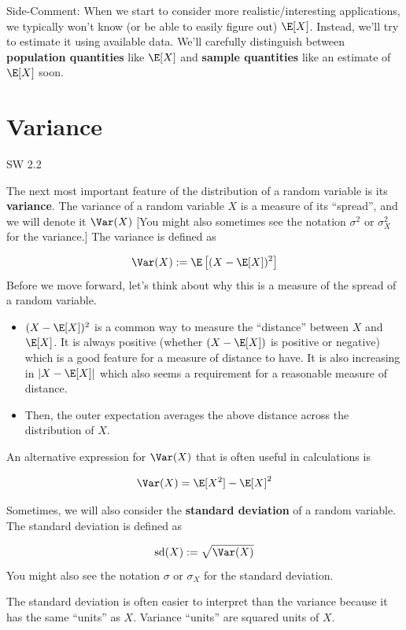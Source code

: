 \documentclass[
  letterpaper,
  DIV=11,
  numbers=noendperiod]{scrreprt}
\begin{document}
{Side-Comment:} When we start to consider more realistic/interesting
applications, we typically won't know (or be able to easily figure out)
\(\E[X]\). Instead, we'll try to estimate it using available data. We'll
carefully distinguish between \textbf{population quantities} like
\(\E[X]\) and \textbf{sample quantities} like an estimate of \(\E[X]\)
soon.

\section{Variance}\label{variance}

SW 2.2

The next most important feature of the distribution of a random variable
is its \textbf{variance}. The variance of a random variable \(X\) is a
measure of its ``spread'', and we will denote it \(\Var(X)\) {[}You
might also sometimes see the notation \(\sigma^2\) or \(\sigma_X^2\) for
the variance.{]} The variance is defined as

\[
  \Var(X) := \E\left[ (X - \E[X])^2 \right]
\] Before we move forward, let's think about why this is a measure of
the spread of a random variable.

\begin{itemize}
\item
  \((X-\E[X])^2\) is a common way to measure the ``distance'' between
  \(X\) and \(\E[X]\). It is always positive (whether \((X - \E[X])\) is
  positive or negative) which is a good feature for a measure of
  distance to have. It is also increasing in \(|X-\E[X]|\) which also
  seems a requirement for a reasonable measure of distance.
\item
  Then, the outer expectation averages the above distance across the
  distribution of \(X\).
\end{itemize}

An alternative expression for \(\Var(X)\) that is often useful in
calculations is

\[
  \Var(X) = \E[X^2] - \E[X]^2
\]

Sometimes, we will also consider the \textbf{standard deviation} of a
random variable. The standard deviation is defined as

\[
  \textrm{sd}(X) := \sqrt{\Var(X)}
\] You might also see the notation \(\sigma\) or \(\sigma_X\) for the
standard deviation.

The standard deviation is often easier to interpret than the variance
because it has the same ``units'' as \(X\). Variance ``units'' are
squared units of \(X\).
\end{document}
